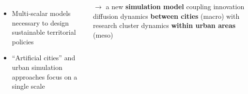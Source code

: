 \documentclass[a0paper]{tikzposter}
\begin{document}
\begin{columns}
{%


           
            
			\begin{itemize}
				\item Multi-scalar models necessary to design sustainable territorial policies \cite{rozenblat2018conclusion}
				\item ``Artificial cities'' \cite{raimbault2020cities} and urban simulation approaches focus on a single scale
			\end{itemize}
			
			$\rightarrow$ a new \textbf{simulation model} coupling innovation diffusion dynamics \textbf{between cities} (macro) \cite{raimbault2020modelshort} with research cluster dynamics \textbf{within urban areas} (meso) \cite{raimbault2022innovationshort}
		
		}
		
	\end{columns}
	
\end{document}
